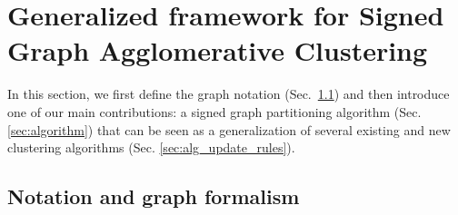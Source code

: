 
\section{Generalized framework for Signed Graph Agglomerative Clustering} \label{sec:general_framework}
In this section, we first define the graph notation (Sec.~\ref{sec:notation}) and then introduce one of our main contributions: a signed graph partitioning algorithm (Sec. \ref{sec:algorithm}) that can be seen as a generalization of several existing and new clustering algorithms (Sec. \ref{sec:alg_update_rules}).

\subsection{Notation and graph formalism} \label{sec:notation}

